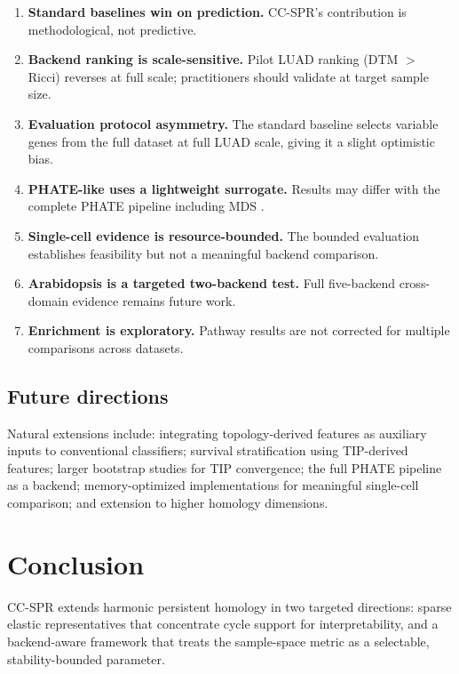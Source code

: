 \documentclass[12pt]{article}
\begin{document}
\begin{enumerate}[leftmargin=1.5em]
\item \textbf{Standard baselines win on prediction.}
CC-SPR's contribution is methodological, not predictive.
\item \textbf{Backend ranking is scale-sensitive.}
Pilot LUAD ranking (DTM $>$ Ricci) reverses at full scale; practitioners should validate at target sample size.
\item \textbf{Evaluation protocol asymmetry.}
The standard baseline selects variable genes from the full dataset at full LUAD scale, giving it a slight optimistic bias.
\item \textbf{PHATE-like uses a lightweight surrogate.}
Results may differ with the complete PHATE pipeline including MDS \cite{moon2019phate}.
\item \textbf{Single-cell evidence is resource-bounded.}
The bounded evaluation establishes feasibility but not a meaningful backend comparison.
\item \textbf{Arabidopsis is a targeted two-backend test.}
Full five-backend cross-domain evidence remains future work.
\item \textbf{Enrichment is exploratory.}
Pathway results are not corrected for multiple comparisons across datasets.
\end{enumerate}

\subsection{Future directions}

Natural extensions include: integrating topology-derived features as auxiliary inputs to conventional classifiers; survival stratification using TIP-derived features; larger bootstrap studies for TIP convergence; the full PHATE pipeline as a backend; memory-optimized implementations for meaningful single-cell comparison; and extension to higher homology dimensions.

\section{Conclusion}
\label{sec:conclusion}

CC-SPR extends harmonic persistent homology in two targeted directions: sparse elastic representatives that concentrate cycle support for interpretability, and a backend-aware framework that treats the sample-space metric as a selectable, stability-bounded parameter.
\end{document}
